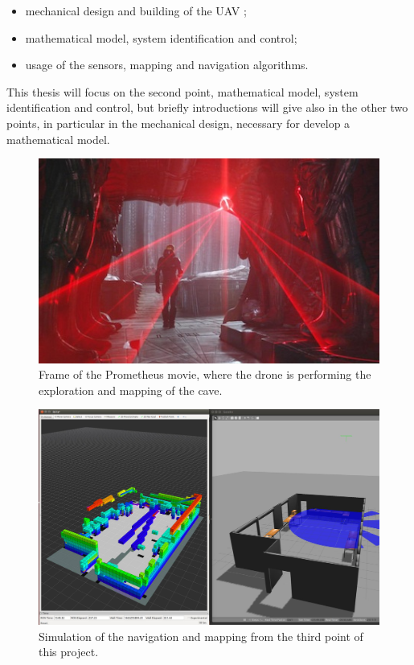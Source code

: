 \begin{itemize}
	\item mechanical design and building of the UAV \cite{Carlos};
	\item mathematical model, system identification and control;
	\item usage of the sensors, mapping and navigation algorithms.
\end{itemize}

\noindent This thesis will focus on the second point, mathematical model, system identification and control, but briefly introductions will give also in the other two points, in particular in the mechanical design, necessary for develop a mathematical model. 

\begin{figure}
	\includegraphics[scale=0.6]{images/prometheus_film.jpg}
	\caption{Frame of the Prometheus movie, where the drone is performing the exploration and mapping of the cave.}
	\label{fig:prometheusFILM}
\end{figure}

\begin{figure}
	\includegraphics[scale=0.1364]{images/simulation_Romain.png}
	\caption{Simulation of the navigation and mapping from the third point of this project.}
	\label{fig:simulationRomain}
\end{figure}


